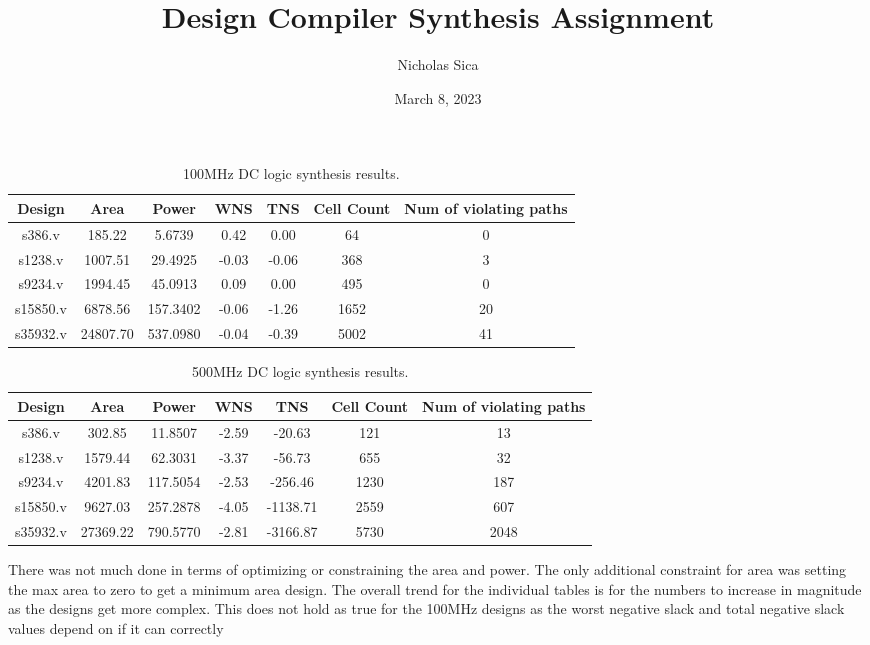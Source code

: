 \documentclass[journal, onecolumn]{IEEEtran}
\title{Design Compiler Synthesis Assignment}
\author{Nicholas Sica}
\date{March 8, 2023}
\begin{document}
\maketitle
\begin{table}
  \centering
  \caption{100MHz DC logic synthesis results.}
  \begin{tabular}{ |c|c|c|c|c|c|c| }
    \hline
    Design & Area & Power & WNS & TNS & Cell Count & Num of violating paths \\
    \hline
    s386.v & 185.22 & 5.6739 & 0.42 & 0.00 & 64 & 0 \\
    \hline
    s1238.v & 1007.51 & 29.4925 & -0.03 & -0.06 & 368 & 3 \\
    \hline
    s9234.v & 1994.45 & 45.0913 & 0.09 & 0.00 & 495 & 0 \\
    \hline
    s15850.v & 6878.56 & 157.3402 & -0.06 & -1.26 & 1652 & 20 \\
    \hline
    s35932.v & 24807.70 & 537.0980 & -0.04 & -0.39 & 5002 & 41 \\
    \hline
  \end{tabular}
\end{table}
\begin{table}
  \centering
  \caption{500MHz DC logic synthesis results.}
  \begin{tabular}{ |c|c|c|c|c|c|c| }
    \hline
    Design & Area & Power & WNS & TNS & Cell Count & Num of violating paths \\
    \hline
    s386.v & 302.85 & 11.8507 & -2.59 & -20.63 & 121 & 13 \\
    \hline
    s1238.v & 1579.44 & 62.3031 & -3.37 & -56.73 & 655 & 32 \\
    \hline
    s9234.v & 4201.83 & 117.5054 & -2.53 & -256.46 & 1230 & 187 \\
    \hline
    s15850.v & 9627.03 & 257.2878 & -4.05 & -1138.71 & 2559 & 607 \\
    \hline
    s35932.v & 27369.22 & 790.5770 & -2.81 & -3166.87 & 5730 & 2048 \\
    \hline
  \end{tabular}
\end{table}
There was not much done in terms of optimizing or constraining the area and power. The only additional constraint for area was setting the max area to zero to get
a minimum area design. The overall trend for the individual tables is for the numbers to increase in magnitude as the designs get more complex.
This does not hold as true for the 100MHz designs as the worst negative slack and total negative slack values depend on if it can correctly
\end{document}
